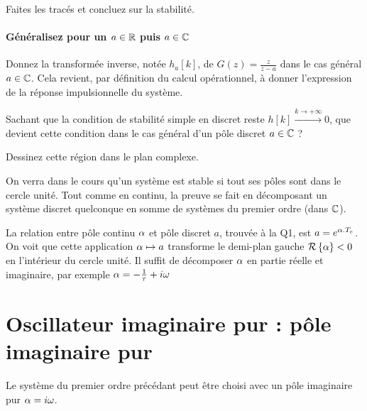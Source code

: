 
Faites les tracés et concluez sur la stabilité.

\paragraph{Généralisez pour un $a\in\mathbb{R}$ puis $a\in\mathbb{C}$}

Donnez la transformée inverse, notée $h_a[k]$, de $G(z)=\frac{z}{z-a}$
dans le cas général $a\in\mathbb{C}$. Cela revient, par définition du calcul
opérationnel, à donner l'expression de la réponse impulsionnelle du
système.

Sachant que la condition de stabilité simple en discret reste 
$h[k] \xrightarrow{k\to +\infty} 0 $, que devient cette condition dans
le cas général d'un pôle discret $a\in\mathbb{C}$ ?


Dessinez cette région dans le plan complexe.

\begin{remarque}
  On verra dans le cours qu'un système est stable si tout ses pôles
  sont dans le cercle unité. Tout comme en continu, la preuve se fait
  en décomposant un système discret quelconque en somme de systèmes du
  premier ordre (dans $\mathbb{C}$).

  La relation entre pôle continu $\alpha$ et pôle discret $a$, trouvée à
  la Q1, est $a=e^{\alpha.T_e}$. On voit que cette application
  $\alpha \mapsto a$ transforme le demi-plan gauche
  $\mathcal{R}\left\{\alpha\right\} < 0$ en l'intérieur du cercle
  unité. Il suffit de décomposer $\alpha$ en partie réelle et imaginaire,
  par exemple $\alpha = -\frac{1}{\tau} + i \omega$
\end{remarque}

\section{Oscillateur imaginaire pur : pôle imaginaire pur}
Le système du premier ordre précédant peut être choisi avec un pôle
imaginaire pur $\alpha= i\omega$.

